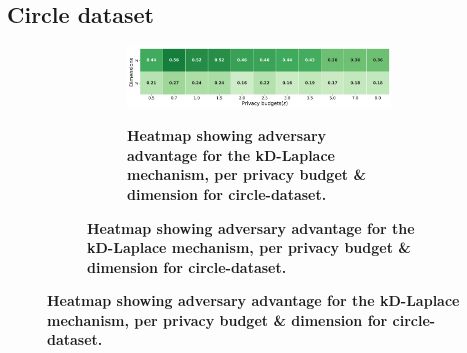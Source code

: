 \newpage
\subsection{Circle dataset}
\begin{figure}[H]
  \centering
  \begin{subfigure}[b]{0.85\textwidth}
    \begin{subfigure}[c]{1\textwidth}
      \caption{\textbf{Heatmap showing adversary advantage for the kD-Laplace mechanism, per privacy budget \& dimension for circle-dataset.}}
      \includegraphics[width=1\textwidth]{Results/kd-laplace/kd-Laplace/circle-dataset/shokri_mi_adv.png}
      \label{fig:privacy_circle-dataset_adversial_advantage_kd-laplace}
    \end{subfigure}
    \vfill %


\end{subfigure}
\end{figure}
